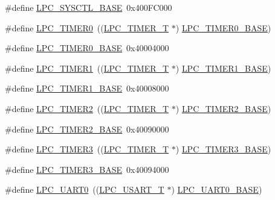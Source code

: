 \begin{DoxyCompactItemize}
\item 
\#define \hyperlink{group__PERIPH__177X__8X__BASE_gae4670b50fe27772fa31de1da10bec7b7}{L\+P\+C\+\_\+\+S\+Y\+S\+C\+T\+L\+\_\+\+B\+A\+SE}~0x400\+F\+C000
\item 
\#define \hyperlink{group__PERIPH__177X__8X__BASE_ga800f32a8a38d9e9c8f3b6ab161f6f2d2}{L\+P\+C\+\_\+\+T\+I\+M\+E\+R0}~((\hyperlink{structLPC__TIMER__T}{L\+P\+C\+\_\+\+T\+I\+M\+E\+R\+\_\+T}            $\ast$) \hyperlink{group__PERIPH__407X__8X__BASE_ga58d2cc2a6a4bd9319853ad5b62a20d43}{L\+P\+C\+\_\+\+T\+I\+M\+E\+R0\+\_\+\+B\+A\+SE})
\item 
\#define \hyperlink{group__PERIPH__177X__8X__BASE_ga58d2cc2a6a4bd9319853ad5b62a20d43}{L\+P\+C\+\_\+\+T\+I\+M\+E\+R0\+\_\+\+B\+A\+SE}~0x40004000
\item 
\#define \hyperlink{group__PERIPH__177X__8X__BASE_ga0d28200f11e877cece24025ebe7fe72a}{L\+P\+C\+\_\+\+T\+I\+M\+E\+R1}~((\hyperlink{structLPC__TIMER__T}{L\+P\+C\+\_\+\+T\+I\+M\+E\+R\+\_\+T}            $\ast$) \hyperlink{group__PERIPH__407X__8X__BASE_ga077e94a95d95d79f6aeb0ea962377c46}{L\+P\+C\+\_\+\+T\+I\+M\+E\+R1\+\_\+\+B\+A\+SE})
\item 
\#define \hyperlink{group__PERIPH__177X__8X__BASE_ga077e94a95d95d79f6aeb0ea962377c46}{L\+P\+C\+\_\+\+T\+I\+M\+E\+R1\+\_\+\+B\+A\+SE}~0x40008000
\item 
\#define \hyperlink{group__PERIPH__177X__8X__BASE_gae0a3c421e7e1ac3ffd7e740e33387dc5}{L\+P\+C\+\_\+\+T\+I\+M\+E\+R2}~((\hyperlink{structLPC__TIMER__T}{L\+P\+C\+\_\+\+T\+I\+M\+E\+R\+\_\+T}            $\ast$) \hyperlink{group__PERIPH__407X__8X__BASE_gab46122134a159b494e060ae3a7be0967}{L\+P\+C\+\_\+\+T\+I\+M\+E\+R2\+\_\+\+B\+A\+SE})
\item 
\#define \hyperlink{group__PERIPH__177X__8X__BASE_gab46122134a159b494e060ae3a7be0967}{L\+P\+C\+\_\+\+T\+I\+M\+E\+R2\+\_\+\+B\+A\+SE}~0x40090000
\item 
\#define \hyperlink{group__PERIPH__177X__8X__BASE_gab34ae64ea250497b5148b7ffb61d04f5}{L\+P\+C\+\_\+\+T\+I\+M\+E\+R3}~((\hyperlink{structLPC__TIMER__T}{L\+P\+C\+\_\+\+T\+I\+M\+E\+R\+\_\+T}            $\ast$) \hyperlink{group__PERIPH__407X__8X__BASE_ga002e95d51eef32473052ea2575440eac}{L\+P\+C\+\_\+\+T\+I\+M\+E\+R3\+\_\+\+B\+A\+SE})
\item 
\#define \hyperlink{group__PERIPH__177X__8X__BASE_ga002e95d51eef32473052ea2575440eac}{L\+P\+C\+\_\+\+T\+I\+M\+E\+R3\+\_\+\+B\+A\+SE}~0x40094000
\item 
\#define \hyperlink{group__PERIPH__177X__8X__BASE_ga6ba29f0f9b8af2f72e303533185bcc82}{L\+P\+C\+\_\+\+U\+A\+R\+T0}~((\hyperlink{structLPC__USART__T}{L\+P\+C\+\_\+\+U\+S\+A\+R\+T\+\_\+T}            $\ast$) \hyperlink{group__PERIPH__407X__8X__BASE_gaa96fb70405a1298b350fc6f0ad0af997}{L\+P\+C\+\_\+\+U\+A\+R\+T0\+\_\+\+B\+A\+SE})

\end{DoxyCompactItemize}
